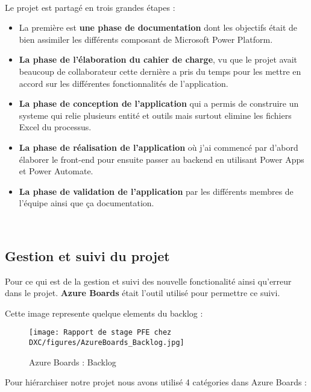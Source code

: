 \\
Le projet est partagé en trois grandes étapes : 
\\
\begin{itemize}
  \item La première est \textbf{une phase de documentation} dont les objectifs était de bien assimiler les différents composant de Microsoft Power Platform.
  \\
  \item \textbf{La phase de l'élaboration du cahier de charge}, vu que le projet avait beaucoup de collaborateur cette dernière a pris du temps pour les mettre en accord sur les différentes fonctionnalités de l'application.
  \\
  \item \textbf{La phase de conception de l'application} qui a permis de construire un systeme qui relie plusieurs entité et outils mais surtout elimine les fichiers Excel du processus.
  \\
  \item \textbf{La phase de réalisation de l'application} où j'ai commencé par d'abord élaborer le front-end pour ensuite passer au backend en utilisant Power Apps et Power Automate.
  \\
  \item \textbf{La phase de validation de l'application} par les différents membres de l'équipe ainsi que ça documentation.
  \\
\end{itemize}
\\

\subsection{Gestion et suivi du projet}
Pour ce qui est de la gestion et suivi des nouvelle fonctionalité ainsi qu'erreur dans le projet. \textbf{Azure Boards} était l'outil utilisé pour permettre ce suivi.

Cette image represente quelque elements du backlog :

\begin{figure}[!h]
    \centering
    \texttt{[image: Rapport de stage PFE chez DXC/figures/AzureBoards\_Backlog.jpg]}
    \caption{Azure Boards : Backlog}
\end{figure}

Pour hiérarchiser notre projet nous avons utilisé 4 catégories dans Azure Boards :
\\

